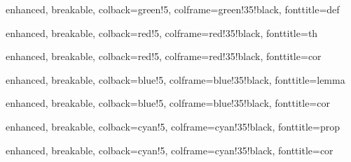\usepackage{chemformula}










\usepackage{footnote}

\usepackage[many]{tcolorbox}


%
{enhanced, breakable, colback=green!5, colframe=green!35!black, fonttitle=\bfseries}{def}

%
{enhanced, breakable, colback=red!5, colframe=red!35!black, fonttitle=\bfseries}{th}

%
{enhanced, breakable, colback=red!5, colframe=red!35!black, fonttitle=\bfseries}{cor}

%
{enhanced, breakable, colback=blue!5, colframe=blue!35!black, fonttitle=\bfseries}{lemma}

%
{enhanced, breakable, colback=blue!5, colframe=blue!35!black, fonttitle=\bfseries}{cor}

%
{enhanced, breakable, colback=cyan!5, colframe=cyan!35!black, fonttitle=\bfseries}{prop}

%
{enhanced, breakable, colback=cyan!5, colframe=cyan!35!black, fonttitle=\bfseries}{cor}

